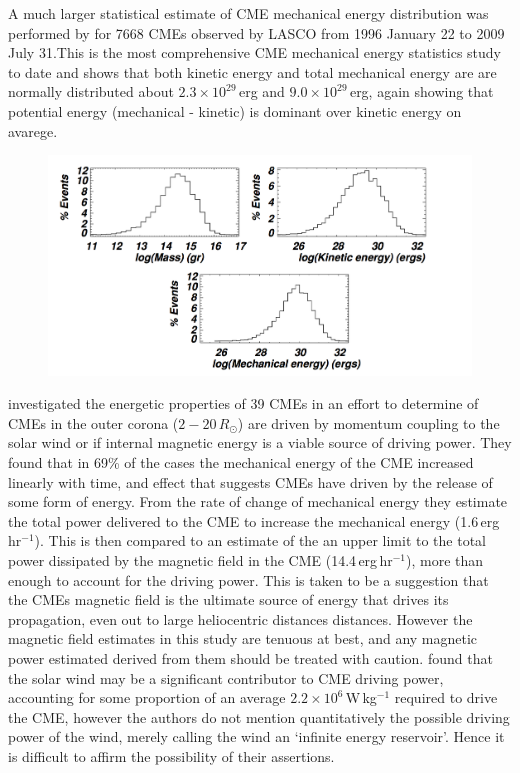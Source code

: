 A much larger statistical estimate of CME mechanical energy distribution was performed by \citep{vour2010} for 7668 CMEs observed by LASCO from 1996 January 22 to 2009 July 31.This is the most comprehensive CME mechanical energy statistics study to date and shows that both kinetic energy and total mechanical energy are are normally distributed about $2.3\times10^{29}$\,erg and $9.0\times10^{29}$\,erg, again showing that potential energy (mechanical - kinetic) is dominant over kinetic energy on avarege.
\begin{figure}[h!]
\begin{center}
\includegraphics[trim = 4cm 0.0cm 0cm 0cm, scale=0.35]{images/energy_dist}
\caption{ \citep{vour2010}}
\end{center}
\label{fig:energy_dist}
\end{figure}



\citep{subram2007} investigated the energetic properties of 39 CMEs in an effort to determine of CMEs in the outer corona ($2-20\,R_{\odot}$) are driven by momentum coupling to the solar wind or if internal magnetic energy is a viable source of driving power. They found that in 69\% of the cases the mechanical energy of the CME increased linearly with time, and effect that suggests CMEs have driven by the release of some form of energy. From the rate of change of mechanical energy they estimate the total power delivered to the CME to increase the mechanical energy (1.6\,erg\,hr$^{-1}$). This is then compared to an estimate of the an upper limit to the total power dissipated by the magnetic field in the CME (14.4\,erg\,hr$^{-1}$), more than enough to account for the driving power. This is taken to be a suggestion that the CMEs magnetic field is the ultimate source of energy that drives its propagation, even out to large heliocentric distances distances. However the magnetic field estimates in this study are tenuous at best, and any magnetic power estimated derived from them should be treated with caution. \citet{lewis2002} found that the solar wind may be a significant contributor to CME driving power, accounting for some proportion of an average $2.2\times10^6$\,W\,kg$^{-1}$ required to drive the CME, however the authors do not mention quantitatively the possible driving power of the wind, merely calling the wind an \textquoteleft infinite energy reservoir'. Hence it is difficult to affirm the possibility of their assertions.

